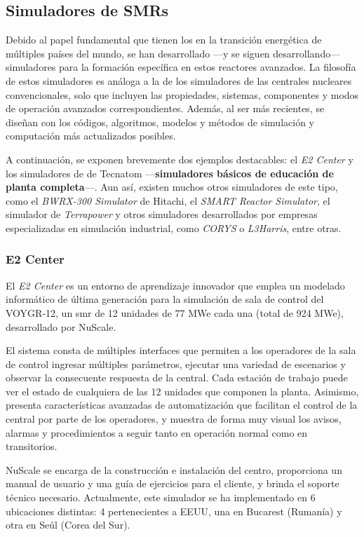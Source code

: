 \subsection{Simuladores de SMRs}

Debido al papel fundamental que tienen los  en la transición energética de múltiples países del mundo, se han desarrollado ---y se siguen desarrollando--- simuladores para la formación específica en estos reactores avanzados. La filosofía de estos simuladores es análoga a la de los simuladores de las centrales nucleares convencionales, solo que incluyen las propiedades, sistemas, componentes y  modos de operación avanzados correspondientes. Además, al ser más recientes, se diseñan con los códigos, algoritmos, modelos y métodos de simulación y computación más actualizados posibles. 

A continuación, se exponen brevemente dos ejemplos destacables: el \textit{E2 Center} y los simuladores de  de Tecnatom ---\textbf{simuladores básicos de educación de planta completa}---. Aun así, existen muchos otros simuladores de este tipo, como el \textit{BWRX-300 Simulator} de Hitachi, el \textit{SMART Reactor Simulator}, el simulador de \textit{Terrapower} y otros simuladores desarrollados por empresas especializadas en simulación industrial, como \textit{CORYS} o \textit{L3Harris}, entre otras.

\subsubsection{E2 Center}

El \textit{E2 Center} es un entorno de aprendizaje innovador que emplea un modelado informático de última generación para la simulación de sala de control del VOYGR-12, un \acrlong{smr} de 12 unidades de 77 MWe cada una (total de 924 MWe), desarrollado por NuScale.

El sistema consta de múltiples interfaces que permiten a los operadores de la sala de control ingresar múltiples parámetros, ejecutar una variedad de escenarios y observar la consecuente respuesta de la central. Cada estación de trabajo puede ver el estado de cualquiera de las 12 unidades que componen la planta. Asimismo, presenta características avanzadas de automatización que facilitan el control de la central por parte de los operadores, y muestra de forma muy visual los avisos, alarmas y procedimientos a seguir tanto en operación normal como en transitorios.

NuScale se encarga de la construcción e instalación del centro, proporciona un manual de usuario y una guía de ejercicios para el cliente, y brinda el soporte técnico necesario. Actualmente, este simulador se ha implementado en 6 ubicaciones distintas: 4 pertenecientes a EEUU, una en Bucarest (Rumanía) y otra en Seúl (Corea del Sur).

